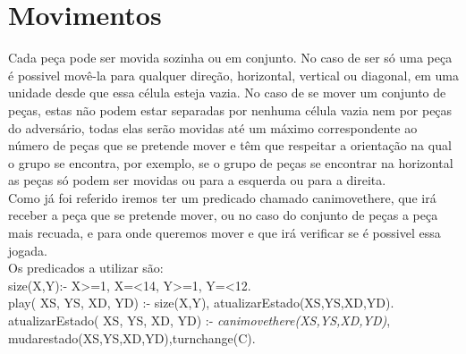 \documentclass[a4paper]{article}
\begin{document}
\section{Movimentos}
Cada peça pode ser movida sozinha ou em conjunto. No caso de ser só uma peça é possivel movê-la para qualquer direção, horizontal, vertical ou diagonal, em uma unidade desde que essa célula esteja vazia. No caso de se mover um conjunto de peças, estas não podem estar separadas por nenhuma célula vazia nem por peças do adversário, todas elas serão movidas até um máximo correspondente ao número de peças que se pretende mover e têm que respeitar a orientação na qual o grupo se encontra, por exemplo, se o grupo de peças se encontrar na horizontal as peças só podem ser movidas ou para a esquerda ou para a direita.
\\\linebreak
Como já foi referido iremos ter um predicado chamado canimovethere, que irá receber a peça que se pretende mover, ou no caso do conjunto de peças a peça mais recuada, e para onde queremos mover e que irá verificar se é possivel essa jogada.
\\\linebreak
Os predicados a utilizar são:
\\\linebreak
size(X,Y):- X\textgreater=1, X=\textless14, Y\textgreater=1, Y=\textless12.
\\\linebreak
play( XS, YS, XD, YD) :-  size(X,Y), atualizarEstado(XS,YS,XD,YD).
\\\linebreak
atualizarEstado( XS, YS, XD, YD) :- \textit{canimovethere(XS,YS,XD,YD)}, mudarestado(XS,YS,XD,YD),turnchange(C).
\end{document}
